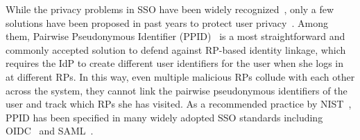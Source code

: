 


While the privacy problems in SSO have been widely recognized~\cite{maler2008venn,NIST2017draft}, only a few solutions have been proposed in past years to protect user privacy~\cite{persona,SPRESSO}. Among them, Pairwise Pseudonymous Identifier (PPID)~\cite{OpenIDConnect, SAMLIdentifier} is a most straightforward and commonly accepted solution to defend against RP-based identity linkage, which requires the IdP to create different user identifiers for the user when she logs in at different RPs. In this way, even multiple malicious RPs collude with each other across the system, they cannot link the  pairwise pseudonymous identifiers of the user and track which RPs she has visited. As a recommended practice by NIST~\cite{NIST2017draft}, PPID has been specified in many widely adopted SSO standards including OIDC~\cite{OpenIDConnect} and SAML~\cite{SAMLIdentifier}.


